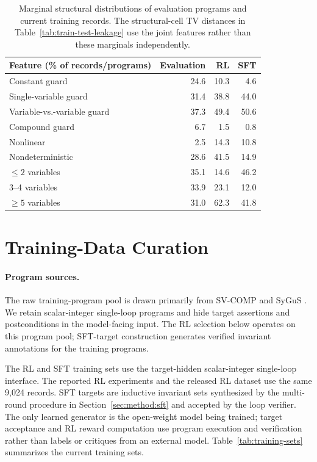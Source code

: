\begin{table}[H]
\centering
\setlength{\tabcolsep}{8pt}
\begin{tabular}{lrrr}
\toprule
\rowcolor{algobg}
Feature (\% of records/programs) & Evaluation & RL & SFT \\
\midrule
Constant guard & 24.6 & 10.3 & 4.6 \\
Single-variable guard & 31.4 & 38.8 & 44.0 \\
Variable-vs.-variable guard & 37.3 & 49.4 & 50.6 \\
Compound guard & 6.7 & 1.5 & 0.8 \\
Nonlinear & 2.5 & 14.3 & 10.8 \\
Nondeterministic & 28.6 & 41.5 & 14.9 \\
\(\leq 2\) variables & 35.1 & 14.6 & 46.2 \\
3--4 variables & 33.9 & 23.1 & 12.0 \\
\(\geq 5\) variables & 31.0 & 62.3 & 41.8 \\
\bottomrule
\end{tabular}
\caption{Marginal structural distributions of evaluation programs and current
training records.  The structural-cell TV distances in
Table~\ref{tab:train-test-leakage} use the joint features rather than these
marginals independently.}
\label{tab:train-test-marginals}
\end{table}

\section{Training-Data Curation}
\label{app:data-curation}

\paragraph{Program sources.}
The raw training-program pool is drawn primarily from SV-COMP and SyGuS
\citep{svcomp,alur2013sygus}.  We retain scalar-integer single-loop programs
and hide target assertions and postconditions in the model-facing input.
The RL selection below operates on this program pool; SFT-target construction
generates verified invariant annotations for the training programs.

The RL and SFT training sets use the target-hidden scalar-integer single-loop
interface.  The reported RL experiments and the released RL dataset use the
same 9,024 records.  SFT targets are inductive invariant sets synthesized by
the multi-round procedure in Section~\ref{sec:method:sft} and accepted by the
loop verifier.  The only learned generator is the open-weight model being
trained; target acceptance and RL reward computation use program execution
and verification rather than labels or critiques from an external model.
Table~\ref{tab:training-sets} summarizes the current training sets.

